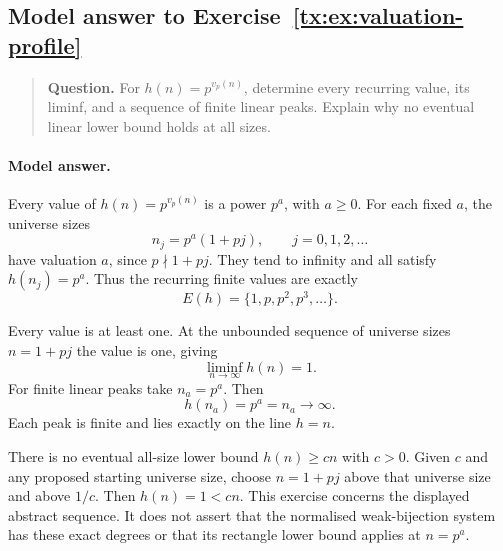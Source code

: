 \begin{samepage}

\subsection*{Model answer to Exercise~\ref{tx:ex:valuation-profile}}\label{tx:ans:valuation-profile}

\begin{quote}\small\textbf{Question.} For $h(n)=p^{v_p(n)}$, determine every recurring value, its liminf,
and a sequence of finite linear peaks. Explain why no eventual linear
lower bound holds at all sizes.
\end{quote}

\paragraph{Model answer.}
Every value of \(h(n)=p^{v_p(n)}\) is a power \(p^a\), with \(a\ge0\).
For each fixed \(a\), the universe sizes
\[
                     n_j=p^a(1+pj),\qquad j=0,1,2,\ldots
\]
have valuation \(a\), since \(p\nmid1+pj\). They tend to infinity
and all satisfy \(h(n_j)=p^a\). Thus the recurring finite values
are exactly
\[
                         E(h)=\{1,p,p^2,p^3,\ldots\}.
\]
\end{samepage}

Every value is at least one. At the unbounded sequence of universe sizes
\(n=1+pj\) the value is one, giving
\[
                            \liminf_{n\to\infty}h(n)=1.
\]
For finite linear peaks take \(n_a=p^a\). Then
\[
                          h(n_a)=p^a=n_a\longrightarrow\infty.
\]
Each peak is finite and lies exactly on the line \(h=n\).

There is no eventual all-size lower bound \(h(n)\ge cn\) with \(c>0\).
Given \(c\) and any proposed starting universe size, choose \(n=1+pj\) above
that universe size and above \(1/c\). Then \(h(n)=1<cn\).
This exercise concerns the displayed abstract sequence. It does not
assert that the normalised weak-bijection system has these exact
degrees or that its rectangle lower bound applies at \(n=p^a\).


\par


